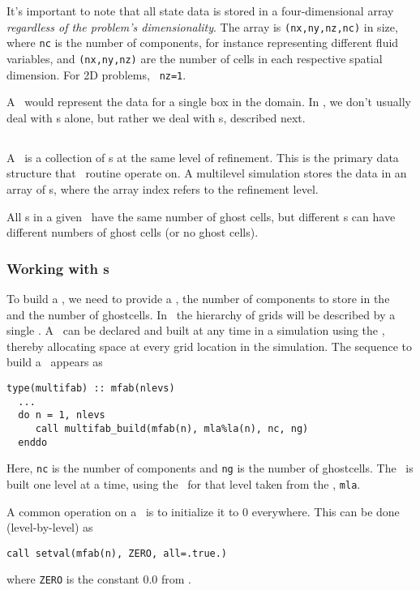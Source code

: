 It's important to note that all state data is stored in a
four-dimensional array {\em regardless of the problem's
  dimensionality}.  The array is {\tt (nx,ny,nz,nc)} in size, where
{\tt nc} is the number of components, for instance representing
different fluid variables, and {\tt (nx,ny,nz)} are the number of
cells in each respective spatial dimension.  For 2D problems, {\tt
  nz=1}.

A \fab\ would represent the data for a single box in the domain.
In \maestro, we don't usually deal with \fab s alone, but rather
we deal with \multifab s, described next.

\subsection{\multifab}

A \multifab\ is a collection of \fab s at the same level of
refinement.  This is the primary data structure that \maestro\
routine operate on.  A multilevel simulation stores the 
data in an array of \multifab s, where the array index refers
to the refinement level.

All \fab s in a given \multifab\ have the same number of ghost cells,
but different \multifab s can have different numbers of ghost cells
(or no ghost cells).

\subsubsection{Working with \multifab s}

To build a \multifab, we need to provide a \layout, the number of
components to store in the \multifab\, and the number of ghostcells.  In
\maestro\, the hierarchy of grids will be described by a single
\mllayout.  A \multifab\ can be declared and built at any time in a
simulation using the \mllayout, thereby allocating space at every
grid location in the simulation.  The sequence to build a \multifab\
appears as
\begin{lstlisting}[language={[95]fortran},mathescape=false]
  type(multifab) :: mfab(nlevs)
  ...
  do n = 1, nlevs
     call multifab_build(mfab(n), mla%la(n), nc, ng)
  enddo
\end{lstlisting}
Here, {\tt nc} is the number of components and {\tt ng} is the number
of ghostcells.  The \multifab\ is built one level at a time, using the
\layout\ for that level taken from the \mllayout, {\tt mla}.

A common operation on a \multifab\ is to initialize it to $0$
everywhere.  This can be done (level-by-level) as
\begin{lstlisting}[language={[95]fortran},mathescape=false]
call setval(mfab(n), ZERO, all=.true.)
\end{lstlisting}
where {\tt ZERO} is the constant 0.0 from .

